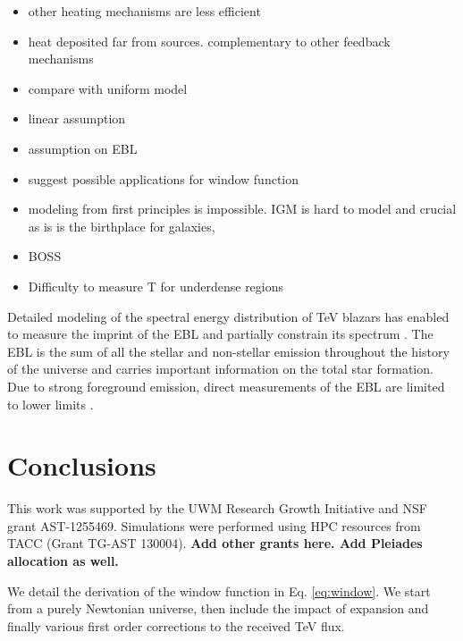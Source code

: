 \documentclass[twocolumns]{emulateapj}
\newcommand\ALc[1]{{\color{red} \bf #1}} %
\begin{document}
 



\begin{itemize}
\item other heating mechanisms are less efficient
\item heat deposited far from sources. complementary to other feedback mechanisms
\item compare with uniform model
\item linear assumption
\item assumption on EBL
\item suggest possible applications for window function
\item modeling from first principles is impossible. IGM is hard to model and crucial as is is the birthplace for galaxies,
\item BOSS
\item Difficulty to measure T for underdense regions
\end{itemize}

Detailed modeling of the spectral energy distribution of TeV blazars has enabled to measure the imprint of the EBL and partially  constrain its spectrum \citep{2013A&A...550A...4H}. The EBL is the sum of all the stellar and non-stellar emission throughout the history of the universe and carries important information on the total star formation. Due to strong foreground emission, direct measurements of the EBL are limited to lower limits \citep{2006A&A...451..417D}. 

\section{Conclusions}


\begin{acknowledgements}
This work was supported by the UWM Research Growth Initiative and NSF grant AST-1255469. Simulations were performed using HPC resources from TACC (Grant TG-AST 130004). \ALc{Add other grants here. Add Pleiades allocation as well.}
\end{acknowledgements}


\appendix

We detail the derivation of the window function in Eq. \ref{eq:window}. We start from a purely Newtonian universe, then include the impact of expansion and finally various first order corrections to the received TeV flux.
\end{document}
